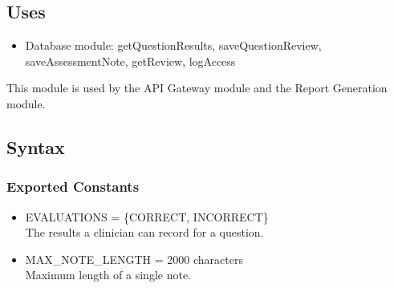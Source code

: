 \documentclass[12pt, titlepage]{article}
\begin{document}
\subsection{Uses}
\begin{itemize}
\item Database module: getQuestionResults, saveQuestionReview, saveAssessmentNote, getReview, logAccess
\end{itemize}
This module is used by the API Gateway module and the Report Generation module.

\subsection{Syntax}

\subsubsection{Exported Constants}
\begin{itemize}
\item EVALUATIONS = \{CORRECT, INCORRECT\}\\
The results a clinician can record for a question.
\item MAX\_NOTE\_LENGTH = 2000 characters\\
Maximum length of a single note.
\end{itemize}
\end{document}
